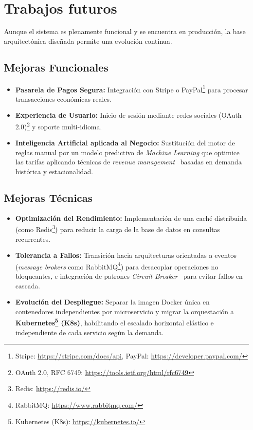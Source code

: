 \section{Trabajos futuros}
\label{sec:trabajos_futuros}

Aunque el sistema es plenamente funcional y se encuentra en producción, la base arquitectónica diseñada permite una evolución continua.

\subsection{Mejoras Funcionales}
\begin{itemize}
    \item \textbf{Pasarela de Pagos Segura:} Integración con Stripe o PayPal\footnote{Stripe: \url{https://stripe.com/docs/api}, PayPal: \url{https://developer.paypal.com/}} para procesar transacciones económicas reales.
    \item \textbf{Experiencia de Usuario:} Inicio de sesión mediante redes sociales (OAuth 2.0)\footnote{OAuth 2.0, RFC 6749: \url{https://tools.ietf.org/html/rfc6749}} y soporte multi-idioma.
    \item \textbf{Inteligencia Artificial aplicada al Negocio:} Sustitución del motor de reglas manual por un modelo predictivo de \textit{Machine Learning} que optimice las tarifas aplicando técnicas de \textit{revenue management}~\cite{talluri2004revenue} basadas en demanda histórica y estacionalidad.
\end{itemize}

\subsection{Mejoras Técnicas}
\begin{itemize}
    \item \textbf{Optimización del Rendimiento:} Implementación de una caché distribuida (como Redis\footnote{Redis: \url{https://redis.io/}}) para reducir la carga de la base de datos en consultas recurrentes.
    \item \textbf{Tolerancia a Fallos:} Transición hacia arquitecturas orientadas a eventos (\textit{message brokers} como RabbitMQ\footnote{RabbitMQ: \url{https://www.rabbitmq.com/}}) para desacoplar operaciones no bloqueantes, e integración de patrones \textit{Circuit Breaker}~\cite{nygard2007release} para evitar fallos en cascada.
    \item \textbf{Evolución del Despliegue:} Separar la imagen Docker única en contenedores independientes por microservicio y migrar la orquestación a \textbf{Kubernetes\footnote{Kubernetes (K8s): \url{https://kubernetes.io/}} (K8s)}, habilitando el escalado horizontal elástico e independiente de cada servicio según la demanda.
\end{itemize}